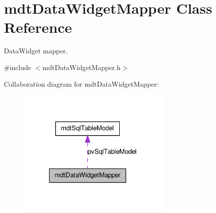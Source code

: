 \hypertarget{classmdt_data_widget_mapper}{
\section{mdtDataWidgetMapper Class Reference}
\label{classmdt_data_widget_mapper}
}


DataWidget mapper.  




{\ttfamily \#include $<$mdtDataWidgetMapper.h$>$}



Collaboration diagram for mdtDataWidgetMapper:
\nopagebreak
\begin{figure}[H]
\begin{center}
\leavevmode
\includegraphics[width=214pt]{classmdt_data_widget_mapper__coll__graph}
\end{center}
\end{figure}
